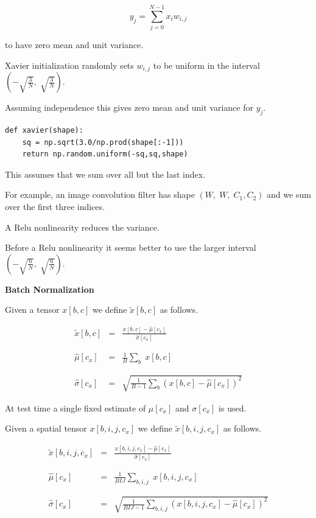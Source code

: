 {\vfill
$$y_j = \sum_{j=0}^{N-1} x_i w_{i,j}$$

\vfill
to have zero mean and unit variance.

\vfill
Xavier initialization randomly sets $w_{i,j}$ to be uniform in the interval $\left(-\sqrt{\frac{3}{N}},\;\sqrt{\frac{3}{N}}\right)$.

\vfill
Assuming independence this gives zero mean and unit variance for $y_j$.


\begin{verbatim}
def xavier(shape):
    sq = np.sqrt(3.0/np.prod(shape[:-1]))
    return np.random.uniform(-sq,sq,shape)
\end{verbatim}

\vfill
This assumes that we sum over all but the last index.

\vfill
For example, an image convolution filter has shape $(W,\;W,\;C_1,C_2)$ and we sum over the first three indices.


A Relu nonlinearity reduces the variance.

\vfill
Before a Relu nonlinearity it seems better to use the larger interval $\left(-\sqrt{\frac{6}{N}},\;\sqrt{\frac{6}{N}}\right)$.

\slide{}
\centerline{\bf Batch Normalization}
\vfill

Given a tensor $x[b,c]$ we define $\tilde{x}[b,c]$ as follows.

\begin{eqnarray*}
  \tilde{x}[b,c]& = & \frac{x[b,c] - \hat{\mu}[c_x]}{\hat{\sigma}[c_x]} \\
  \\
  \\
  \hat{\mu}[c_x] & = & \frac{1}{B} \sum_b\;x[b,c] \\
  \\
  \\
  \hat{\sigma}[c_x] & = & \sqrt{\frac{1}{B-1} \sum_b (x[b,c]-\hat{\mu}[c_x])^2}
\end{eqnarray*}


\vfill
At test time a single fixed estimate of $\mu[c_x]$ and $\sigma[c_x]$ is used.


Given a spatial tensor $x[b,i,j,c_x]$ we define $\tilde{x}[b,i,j,c_x]$ as follows.

\begin{eqnarray*}
  \tilde{x}[b,i,j,c_x]& = & \frac{x[b,i,j,c_x] - \hat{\mu}[c_x]}{\hat{\sigma}[c_x]} \\
  \\
  \\
  \hat{\mu}[c_x] & = & \frac{1}{BIJ} \sum_{b,i,j}\;x[b,i,j,c_x] \\
  \\
  \\
  \hat{\sigma}[c_x] & = & \sqrt{\frac{1}{BIJ-1} \sum_{b,i,j} (x[b,i,j,c_x]-\hat{\mu}[c_x])^2}
\end{eqnarray*}

}
